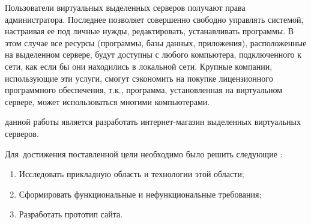 Пользователи виртуальных выделенных серверов получают права администратора.
Последнее позволяет совершенно свободно управлять системой, настраивая ее под личные нужды, редактировать, устанавливать программы.
В этом случае все ресурсы (программы, базы данных, приложения), расположенные на выделенном сервере, будут доступны с любого компьютера, подключенного к сети, как если бы они находились в локальной сети.
Крупные компании, использующие эти услуги, смогут сэкономить на покупке лицензионного программного обеспечения, т.к., программа, установленная на виртуальном сервере, может использоваться многими компьютерами.


{\aim} данной работы является разработать интернет-магазин выделенных виртуальных серверов.

Для~достижения поставленной цели необходимо было решить следующие {\tasks}:
\begin{enumerate}
  \item Исследовать прикладную область и технологии этой области;
  \item Сформировать функциональные и нефункциональные требования;
  \item Разработать прототип сайта.
\end{enumerate}





